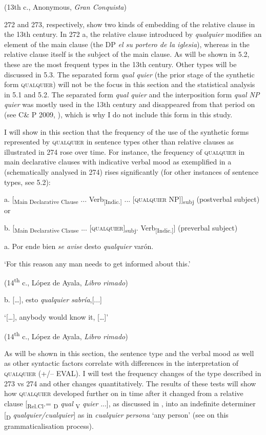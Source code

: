     (13th c., Anonymous, \textit{Gran Conquista})

272 and 273, respectively, show two kinds of embedding of the relative clause in the 13th century. In 272 a, the relative clause introduced by \textit{qualquier} modifies an element of the main clause (the DP \textit{el su portero de la iglesia}), whereas in  the relative clause itself is the subject of the main clause. As will be shown in 5.2, these are the most frequent types in the 13th century. Other types will be discussed in 5.3. The separated form \textit{qual quier} (the prior stage of the synthetic form \textsc{qualquier}) will not be the focus in this section and the statistical analysis in 5.1 and 5.2. The separated form \textit{qual quier} and the interposition form \textit{qual NP quier} was mostly used in the 13th century and disappeared from that period on (see C\& P 2009, \citealt{Pato2012}), which is why I do not include this form in this study. 

  I will show in this section that the frequency of the use of the synthetic forms represented by \textsc{qualquier} in sentence types other than relative clauses as illustrated in 274 rose over time. For instance, the frequency of \textsc{qualquier} in main declarative clauses with indicative verbal mood as exemplified in a (schematically analysed in 274) rises significantly (for other instances of sentence types, see 5.2):

  a.  [\textsubscript{Main Declarative Clause} ... Verb\textsubscript{[Indic.]} ... [\textsc{qualquier} NP]]\textsubscript{subj}    (postverbal subject) or

  b.  [\textsubscript{Main Declarative Clause} ... [\textsc{qualquier}]\textsubscript{subj}. Verb\textsubscript{[Indic.]}]  (preverbal subject)

  a.  Por ende bien \textit{se avise} desto \textit{qualquier} varón. 

    ‘For this reason any man needs to get informed about this.’

    (14\textsuperscript{th} c., López de Ayala, \textit{Libro rimado})

  b.  […], esto \textit{qualquier} \textit{sabría},[...]

‘[…], anybody would know it, […]’

    (14\textsuperscript{th} c., López de Ayala, \textit{Libro rimado})

As will be shown in this section, the sentence type and the verbal mood as well as other syntactic factors correlate with differences in the interpretation of \textsc{qualquier} (+/– EVAL). I will test the frequency changes of the type described in 273 vs 274 and other changes quantitatively. The results of these tests will show how \textsc{qualquier} developed further on in time after it changed from a relative clause [\textsubscript{Rel.Cl}.= \textsubscript{D} \textit{qual} \textsubscript{V} \textit{quier} ...], as discussed in , into an indefinite determiner [\textsubscript{D} \textit{qualquier/cualquier}] as in \textit{cualquier} \textit{persona} ‘any person’ (see  on this grammaticalisation process).

